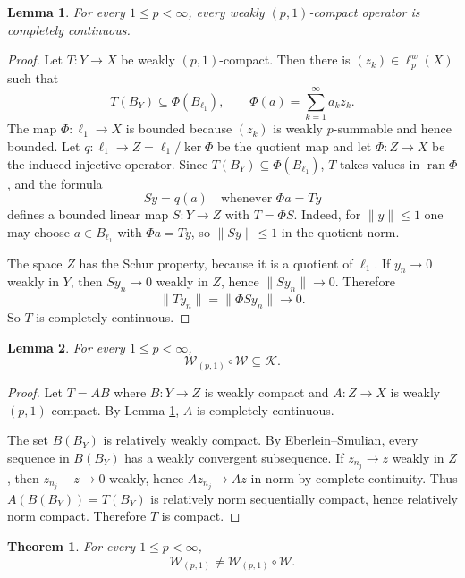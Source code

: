 \documentclass[11pt]{article}
\newtheorem{theorem}{Theorem}
\newtheorem{lemma}{Lemma}
\begin{document}
\begin{lemma}\label{lem:cc}
For every $1\le p<\infty$, every weakly $(p,1)$-compact operator is
completely continuous.
\end{lemma}

\begin{proof}
Let $T:Y\to X$ be weakly $(p,1)$-compact.  Then there is
$(z_k)\in\ell_p^w(X)$ such that
\[
   T(B_Y)\subseteq \Phi(B_{\ell_1}),
   \qquad
   \Phi(a)=\sum_{k=1}^\infty a_kz_k .
\]
The map $\Phi:\ell_1\to X$ is bounded because $(z_k)$ is weakly
$p$-summable and hence bounded.  Let $q:\ell_1\to Z=\ell_1/\ker\Phi$
be the quotient map and let $\overline\Phi:Z\to X$ be the induced
injective operator.  Since $T(B_Y)\subseteq \Phi(B_{\ell_1})$,
$T$ takes values in $\operatorname{ran}\Phi$, and the formula
\[
   Sy=q(a)\quad\text{whenever }\Phi a=Ty
\]
defines a bounded linear map $S:Y\to Z$ with $T=\overline\Phi S$.
Indeed, for $\|y\|\le1$ one may choose $a\in B_{\ell_1}$ with
$\Phi a=Ty$, so $\|Sy\|\le1$ in the quotient norm.

The space $Z$ has the Schur property, because it is a quotient of
$\ell_1$.  If $y_n\to0$ weakly in $Y$, then $Sy_n\to0$ weakly in $Z$,
hence $\|Sy_n\|\to0$.  Therefore
\[
   \|Ty_n\|=\|\overline\Phi Sy_n\|\to0.
\]
So $T$ is completely continuous.
\end{proof}

\begin{lemma}\label{lem:productcompact}
For every $1\le p<\infty$,
\[
   \mathcal W_{(p,1)}\circ\mathcal W \subseteq \mathcal K .
\]
\end{lemma}

\begin{proof}
Let $T=A B$ where $B:Y\to Z$ is weakly compact and
$A:Z\to X$ is weakly $(p,1)$-compact.  By Lemma \ref{lem:cc}, $A$ is
completely continuous.

The set $B(B_Y)$ is relatively weakly compact.  By Eberlein--Smulian,
every sequence in $B(B_Y)$ has a weakly convergent subsequence.  If
$z_{n_j}\to z$ weakly in $Z$, then $z_{n_j}-z\to0$ weakly, hence
$A z_{n_j}\to A z$ in norm by complete continuity.  Thus
$A(B(B_Y))=T(B_Y)$ is relatively norm sequentially compact, hence
relatively norm compact.  Therefore $T$ is compact.
\end{proof}

\begin{theorem}\label{thm:prop45fails}
For every $1\le p<\infty$,
\[
   \mathcal W_{(p,1)}\ne \mathcal W_{(p,1)}\circ\mathcal W .
\]
\end{theorem}
\end{document}
